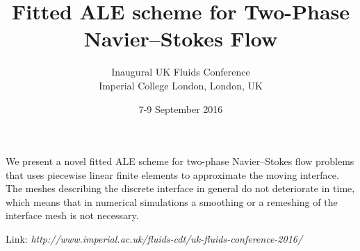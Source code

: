 \documentclass{article}
\begin{document}
\title{Fitted ALE scheme for Two-Phase Navier--Stokes Flow}
\date{7-9 September 2016}
\author{Inaugural UK Fluids Conference\\
Imperial College London, London, UK}

\maketitle

We present a novel fitted ALE scheme for two-phase Navier--Stokes flow problems
that uses piecewise linear finite elements to approximate the moving interface.
The meshes describing the discrete interface in general do not deteriorate in
time, which means that in numerical simulations a smoothing or a remeshing of
the interface mesh is not necessary.

Link: \emph{http://www.imperial.ac.uk/fluids-cdt/uk-fluids-conference-2016/}
\end{document}
